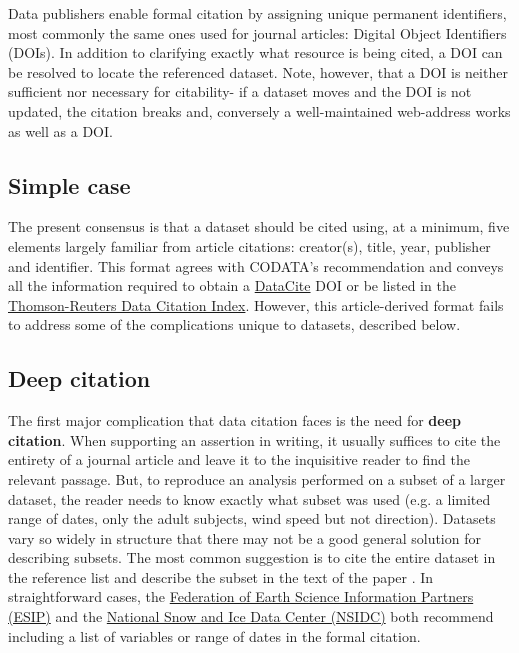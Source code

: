 \documentclass[10pt,a4paper,twocolumn]{article}
\begin{document}
{{Data publishers enable formal citation by assigning unique permanent identifiers, most commonly the same ones used for journal articles: Digital Object Identifiers (DOIs).
In addition to clarifying exactly what resource is being cited, a DOI can be resolved to locate the referenced dataset.
Note, however, that a DOI is neither sufficient nor necessary for citability- if a dataset moves and the DOI is not updated, the citation breaks and, conversely a well-maintained web-address works as well as a DOI.

\subsection*{Simple case}\label{simple-case}

The present consensus is that a dataset should be cited using, at a minimum, five elements largely familiar from article citations: creator(s), title, year, publisher and identifier.
This format agrees with CODATA's recommendation\cite{codata-icsti_task_group_on_data_citation_standards_and_practices_out_2013} and conveys all the information required to obtain a \href{http://www.datacite.org/}{DataCite} DOI\cite{starr_iscitedby:_2011} or be listed in the \href{http://thomsonreuters.com/data-citation-index/}{Thomson-Reuters Data Citation Index}.
However, this article-derived format fails to address some of the complications unique to datasets, described below.

\subsection*{Deep citation}\label{deep-citation}

The first major complication that data citation faces is the need for \textbf{deep citation}.
When supporting an assertion in writing, it usually suffices to cite the entirety of a journal article and leave it to the inquisitive reader to find the relevant passage.
But, to reproduce an analysis performed on a subset of a larger dataset, the reader needs to know exactly what subset was used (e.g. a limited range of dates, only the adult subjects, wind speed but not direction).
Datasets vary so widely in structure that there may not be a good general solution for describing subsets.
The most common suggestion is to cite the entire dataset in the reference list and describe the subset in the text of the paper \cite{altman_proposed_2007}.
In straightforward cases, the \href{http://wiki.esipfed.org/index.php/Interagency_Data_Stewardship/Citations/provider_guidelines#Subset_Used}{Federation of Earth Science Information Partners (ESIP)} and the \href{http://nsidc.org/about/use_copyright.html}{National Snow and Ice Data Center (NSIDC)} both recommend including a list of variables or range of dates in the formal citation.

}}
\end{document}
